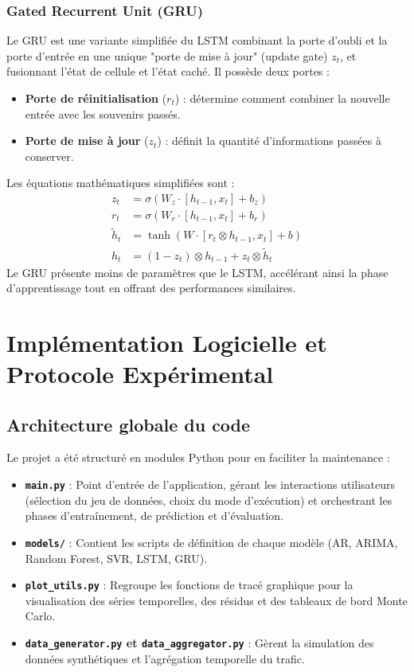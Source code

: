 \documentclass[11pt,a4paper]{article}
\begin{document}
\subsubsection{Gated Recurrent Unit (GRU)}
Le GRU est une variante simplifiée du LSTM combinant la porte d'oubli et la porte d'entrée en une unique "porte de mise à jour" (update gate) $z_t$, et fusionnant l'état de cellule et l'état caché. Il possède deux portes :
\begin{itemize}
    \item \textbf{Porte de réinitialisation} ($r_t$) : détermine comment combiner la nouvelle entrée avec les souvenirs passés.
    \item \textbf{Porte de mise à jour} ($z_t$) : définit la quantité d'informations passées à conserver.
\end{itemize}
Les équations mathématiques simplifiées sont :
\begin{align}
    z_t &= \sigma(W_z \cdot [h_{t-1}, x_t] + b_z) \\
    r_t &= \sigma(W_r \cdot [h_{t-1}, x_t] + b_r) \\
    \tilde{h}_t &= \tanh(W \cdot [r_t \otimes h_{t-1}, x_t] + b) \\
    h_t &= (1 - z_t) \otimes h_{t-1} + z_t \otimes \tilde{h}_t
\end{align}
Le GRU présente moins de paramètres que le LSTM, accélérant ainsi la phase d'apprentissage tout en offrant des performances similaires.

\section{Implémentation Logicielle et Protocole Expérimental}
\label{sec:implementation}
\subsection{Architecture globale du code}
Le projet a été structuré en modules Python pour en faciliter la maintenance :
\begin{itemize}
    \item \textbf{\texttt{main.py}} : Point d'entrée de l'application, gérant les interactions utilisateurs (sélection du jeu de données, choix du mode d'exécution) et orchestrant les phases d'entraînement, de prédiction et d'évaluation.
    \item \textbf{\texttt{models/}} : Contient les scripts de définition de chaque modèle (AR, ARIMA, Random Forest, SVR, LSTM, GRU).
    \item \textbf{\texttt{plot\_utils.py}} : Regroupe les fonctions de tracé graphique pour la visualisation des séries temporelles, des résidus et des tableaux de bord Monte Carlo.
    \item \textbf{\texttt{data\_generator.py} et \texttt{data\_aggregator.py}} : Gèrent la simulation des données synthétiques et l'agrégation temporelle du trafic.
\end{itemize}
\end{document}
